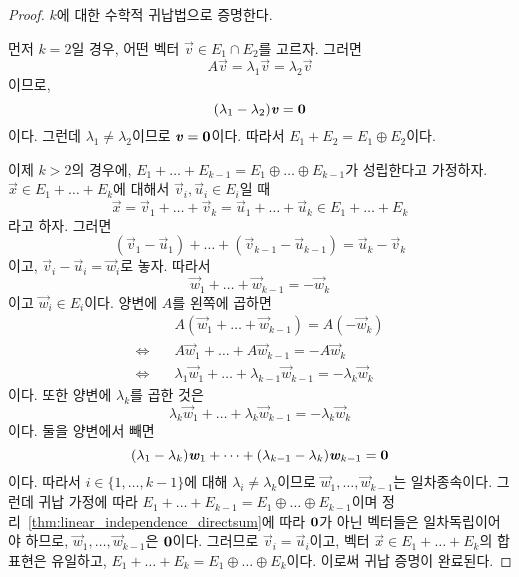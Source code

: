 \documentclass[../engineering_mathematics_lecture_note.tex]{subfiles}
\begin{document}
\begin{proof}
    $k$에 대한 수학적 귀납법으로 증명한다.

    먼저 $k = 2$일 경우, 어떤 벡터 $\vec v \in E_1 \cap E_2$를 고르자.
    그러면
    \begin{equation*}
        A \vec v = \lambda_1 \vec v = \lambda_2 \vec v
    \end{equation*}
    이므로,
    \begin{equation*}
        (\lambda_1 - \lambda_2) \bm{\mathit{v}} = \bm{\mathrm{0}}
    \end{equation*}
    이다.
    그런데 $\lambda_1 \neq \lambda_2$이므로 $\bm{\mathit{v}} = \bm{\mathrm{0}}$이다.
    따라서 $E_1 + E_2 = E_1 \oplus E_2$이다.

    이제 $k > 2$의 경우에, $E_1 + \dots + E_{k - 1} = E_1 \oplus \dots \oplus E_{k - 1}$가 성립한다고 가정하자.
    $\vec x \in E_1 + \dots + E_k$에 대해서 $\vec v_i, \vec u_i \in E_i$일 때
    \begin{equation*}
        \vec x = \vec v_1 + \dots + \vec v_k = \vec u_1 + \dots + \vec u_k \in E_1 + \dots + E_k
    \end{equation*}
    라고 하자.
    그러면
    \begin{equation*}
        (\vec v_1 - \vec u_1) + \dots + (\vec v_{k - 1} - \vec u_{k - 1}) = \vec u_k - \vec v_k
    \end{equation*}
    이고, $\vec v_i - \vec u_i = \vec w_i$로 놓자.
    따라서
    \begin{equation*}
        \vec w_1 + \dots + \vec w_{k - 1} = -\vec w_k
    \end{equation*}
    이고 $\vec w_i \in E_i$이다.
    양변에 $A$를 왼쪽에 곱하면
    \begin{align*}
        &A(\vec w_1 + \dots + \vec w_{k - 1}) = A(-\vec w_k)\\
        \Leftrightarrow\quad &A \vec w_1 + \dots + A \vec w_{k - 1} = -A \vec w_k\\
        \Leftrightarrow\quad &\lambda_1 \vec w_1 + \dots + \lambda_{k - 1} \vec w_{k - 1} = - \lambda_k \vec w_k
    \end{align*}
    이다.
    또한 양변에 $\lambda_k$를 곱한 것은
    \begin{equation*}
        \lambda_k \vec w_1 + \dots + \lambda_k \vec w_{k - 1} = -\lambda_k \vec w_k
    \end{equation*}
    이다.
    둘을 양변에서 빼면
    \begin{equation*}
        (\lambda_1 - \lambda_k) \bm{\mathit{w}}_1 + \dots + (\lambda_{k - 1} - \lambda_k) \bm{\mathit{w}}_{k - 1} = \bm{\mathrm{0}}
    \end{equation*}
    이다.
    따라서 $i \in \{1, \dots, k - 1\}$에 대해 $\lambda_i \neq \lambda_k$이므로 $\vec w_1, \dots, \vec w_{k - 1}$는 일차종속이다.
    그런데 귀납 가정에 따라 $E_1 + \dots + E_{k - 1} = E_1 \oplus \dots \oplus E_{k - 1}$이며 정리~\ref{thm:linear_independence_directsum}에 따라 $\bm{\mathrm{0}}$가 아닌 벡터들은 일차독립이어야 하므로, $\vec w_1, \dots, \vec w_{k - 1}$은 $\bm{\mathrm{0}}$이다.
    그러므로 $\vec v_i = \vec u_i$이고, 벡터 $\vec x \in E_1 + \dots + E_k$의 합 표현은 유일하고, $E_1 + \dots + E_k = E_1 \oplus \dots \oplus E_k$이다.
    이로써 귀납 증명이 완료된다.
\end{proof}
\end{document}
